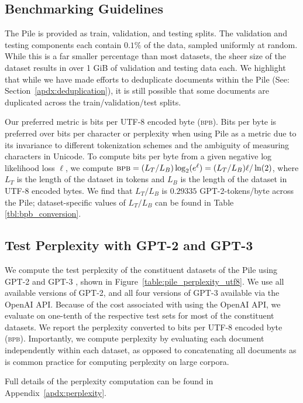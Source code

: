 \documentclass[11pt,a4paper]{article}
\begin{document}
\subsection{Benchmarking Guidelines}

The Pile is provided as train, validation, and testing splits. The validation and testing components each contain $0.1\%$ of the data, sampled uniformly at random. While this is a far smaller percentage than most datasets, the sheer size of the dataset results in over 1 GiB of validation and testing data each. We highlight that while we have made efforts to deduplicate documents within the Pile (See: Section~\ref{apdx:deduplication}), it is still possible that some documents are duplicated across the train/validation/test splits.

Our preferred metric is bits per UTF-8 encoded byte (\textsc{bpb}). Bits per byte is preferred over bits per character or perplexity when using Pile as a metric due to its invariance to different tokenization schemes and the ambiguity of measuring characters in Unicode. To compute bits per byte from a given negative log likelihood loss $\ell$, we compute $\textsc{bpb} = (L_T/L_B) \log_2(e^\ell) = (L_T/L_B) \ell / \ln(2)$, where $L_T$ is the length of the dataset in tokens and $L_B$ is the length of the dataset in UTF-8 encoded bytes. We find that $L_T/L_B$ is $0.29335$ GPT-2-tokens/byte across the Pile; dataset-specific values of $L_T/L_B$ can be found in Table \ref{tbl:bpb_conversion}.

\subsection{Test Perplexity with GPT-2 and GPT-3}

We compute the test perplexity of the constituent datasets of the Pile using GPT-2 \citep{GPT2} and GPT-3 \citep{GPT3}, shown in Figure~\ref{table:pile_perplexity_utf8}. We use all available versions of GPT-2, and all four versions of GPT-3 available via the OpenAI API. Because of the cost associated with using the OpenAI API, we evaluate on one-tenth of the respective test sets for most of the constituent datasets. We report the perplexity converted to bits per UTF-8 encoded byte (\textsc{bpb}). Importantly, we compute perplexity by evaluating each document independently within each dataset, as opposed to concatenating all documents as is common practice for computing perplexity on large corpora.

Full details of the perplexity computation can be found in Appendix~\ref{apdx:perplexity}.
\end{document}
